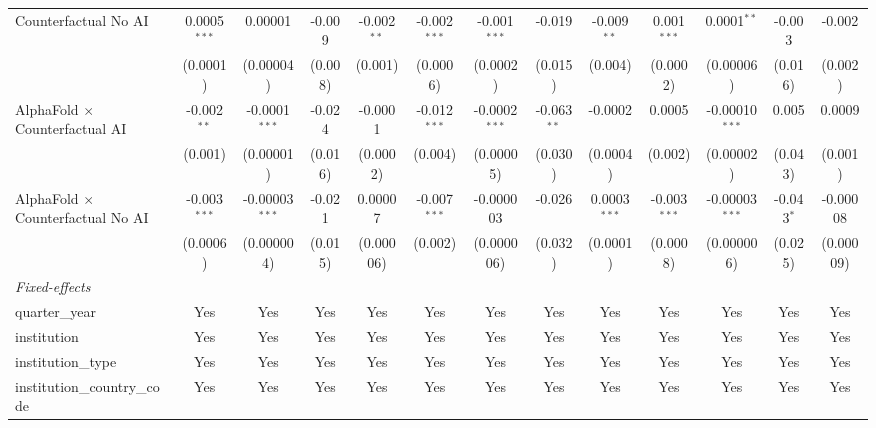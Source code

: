 \begin{tabular}{lcccccccccccc}
   Counterfactual No AI                     & 0.0005$^{***}$ & 0.00001          & -0.009  & -0.002$^{**}$  & -0.002$^{***}$ & -0.001$^{***}$  & -0.019        & -0.009$^{**}$  & 0.001$^{***}$  & 0.0001$^{**}$    & -0.003       & -0.002\\   
                                            & (0.0001)       & (0.00004)        & (0.008) & (0.001)        & (0.0006)       & (0.0002)        & (0.015)       & (0.004)        & (0.0002)       & (0.00006)        & (0.016)      & (0.002)\\   
   AlphaFold $\times$ Counterfactual AI     & -0.002$^{**}$  & -0.0001$^{***}$  & -0.024  & -0.0001        & -0.012$^{***}$ & -0.0002$^{***}$ & -0.063$^{**}$ & -0.0002        & 0.0005         & -0.00010$^{***}$ & 0.005        & 0.0009\\   
                                            & (0.001)        & (0.00001)        & (0.016) & (0.0002)       & (0.004)        & (0.00005)       & (0.030)       & (0.0004)       & (0.002)        & (0.00002)        & (0.043)      & (0.001)\\   
   AlphaFold $\times$ Counterfactual No AI  & -0.003$^{***}$ & -0.00003$^{***}$ & -0.021  & 0.00007        & -0.007$^{***}$ & -0.000003       & -0.026        & 0.0003$^{***}$ & -0.003$^{***}$ & -0.00003$^{***}$ & -0.043$^{*}$ & -0.00008\\   
                                            & (0.0006)       & (0.000004)       & (0.015) & (0.00006)      & (0.002)        & (0.000006)      & (0.032)       & (0.0001)       & (0.0008)       & (0.000006)       & (0.025)      & (0.00009)\\   
   \midrule
   \emph{Fixed-effects}\\
   quarter\_year                            & Yes            & Yes              & Yes     & Yes            & Yes            & Yes             & Yes           & Yes            & Yes            & Yes              & Yes          & Yes\\  
   institution                              & Yes            & Yes              & Yes     & Yes            & Yes            & Yes             & Yes           & Yes            & Yes            & Yes              & Yes          & Yes\\  
   institution\_type                        & Yes            & Yes              & Yes     & Yes            & Yes            & Yes             & Yes           & Yes            & Yes            & Yes              & Yes          & Yes\\  
   institution\_country\_code               & Yes            & Yes              & Yes     & Yes            & Yes            & Yes             & Yes           & Yes            & Yes            & Yes              & Yes          & Yes\\  

\end{tabular}
